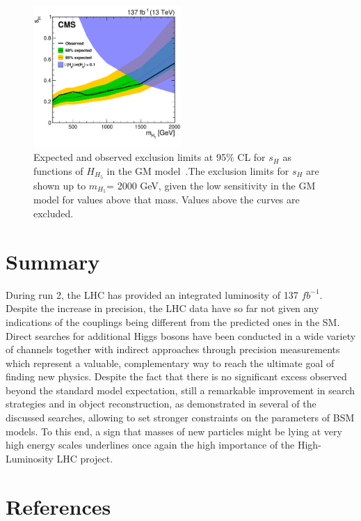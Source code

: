 \documentclass{blois}
\begin{document}
 \begin{figure}[!htb]
    \begin{center}
        \includegraphics[width=0.5\textwidth]{CMS-HIG-20-017_Figure_008-c.png}
        \caption{
              Expected and observed exclusion limits at 95$\%$ CL for $s_{H}$ as functions of $H_{H_{5}}$ in the GM model~\protect\cite{CMS:2021wlt}.The exclusion limits for $s_{H}$ are shown up to $m_{H_{5}}$= 2000 GeV, given the low sensitivity in the GM model for values above that mass. Values above the curves are excluded.
        }
        \label{fig:Georgi_limits}
    \end{center}
\end{figure}
\section{Summary}
During run 2, the LHC has provided an integrated luminosity of 137 $fb^{-1}$. Despite the increase in precision, the LHC data have so far not given any indications of the couplings
being different from the predicted ones in the SM.
Direct searches for additional Higgs bosons have been conducted in a wide variety of channels together with indirect approaches through precision measurements which represent a valuable, complementary way to reach the ultimate goal of finding new physics. Despite the fact that there is no significant excess observed beyond the standard model expectation, still a remarkable improvement in search strategies and in object reconstruction, as demonstrated in several of the discussed searches, allowing to set stronger constraints on the parameters of BSM models.
To this end, a sign that masses of new particles might be lying at very high energy scales underlines once again the high importance of the High-Luminosity LHC project.
\section*{References}

\end{document}
